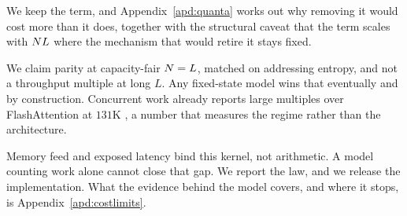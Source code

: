 We keep the term, and Appendix~\ref{apd:quanta} works out why removing it would cost more than it does, together with the structural caveat that the term scales with $N L$ where the mechanism that would retire it stays fixed.

We claim parity at capacity-fair $N = L$, matched on addressing entropy, and not a throughput multiple at long $L$. Any fixed-state model wins that eventually and by construction. Concurrent work already reports large multiples over FlashAttention at $131$K \citep{ghriss2026kata}, a number that measures the regime rather than the architecture.

Memory feed and exposed latency bind this kernel, not arithmetic. A model counting work alone cannot close that gap. We report the law, and we release the implementation. What the evidence behind the model covers, and where it stops, is Appendix~\ref{apd:costlimits}.

